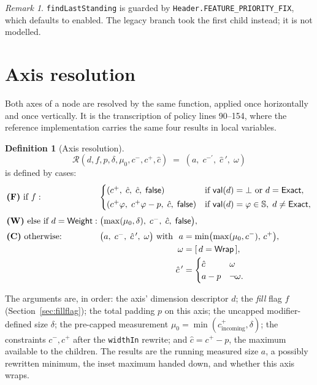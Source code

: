 \documentclass[11pt,a4paper]{article}
\newcommand{\Sc}{\mathbb{S}}
\newcommand{\bo}{\bot}
\newcommand{\Exact}{\mathsf{Exact}}
\newcommand{\Wrap}{\mathsf{Wrap}}
\newcommand{\Weight}{\mathsf{Weight}}
\newcommand{\Rr}{\mathcal{R}}          %
\newcommand{\val}{\mathsf{val}}
\newcommand{\jv}[1]{\texttt{#1}}       %
\theoremstyle{definition}
\newtheorem{definition}{Definition}[section]
\theoremstyle{plain}
\theoremstyle{remark}
\newtheorem*{remark}{Remark}
\begin{document}
\begin{remark}
\jv{findLastStanding} is guarded by \jv{Header.FEATURE\_PRIORITY\_FIX}, which
defaults to enabled. The legacy branch took the first child instead; it is not
modelled.
\end{remark}

\section{Axis resolution}
\label{sec:axis}

Both axes of a node are resolved by the same function, applied once
horizontally and once vertically. It is the transcription of policy lines
90--154, where the reference implementation carries the same four results in
local variables.

\begin{definition}[Axis resolution]
\[
  \Rr(d, f, p, \delta, \mu_0, c^-, c^+, \hat c)
  \;=\; (a,\; c^{-\prime},\; \hat c\,',\; \omega)
\]
is defined by cases:
\[
\begin{array}{@{}l@{\;}l@{}}
\textbf{(F)} \text{ if } f: &
  \begin{cases}
    (c^+,\; \hat c,\; \hat c,\; \textsf{false})
      & \text{if } \val(d) = \bo \text{ or } d = \Exact, \\[2pt]
    (c^+\varphi,\; c^+\varphi - p,\; \hat c,\; \textsf{false})
      & \text{if } \val(d) = \varphi \in \Sc,\; d \neq \Exact,
  \end{cases} \\[16pt]
\textbf{(W)} \text{ else if } d = \Weight: &
  \bigl(\max(\mu_0, \delta),\; c^-,\; \hat c,\; \textsf{false}\bigr), \\[6pt]
\textbf{(C)} \text{ otherwise:} &
  \bigl(a,\; c^-,\; \hat c\,',\; \omega\bigr) \text{ with }
  \begin{aligned}[t]
    a &= \min\bigl(\max(\mu_0, c^-),\, c^+\bigr), \\
    \omega &= [\,d = \Wrap\,], \\
    \hat c\,' &= \begin{cases} \hat c & \omega \\ a - p & \neg\omega. \end{cases}
  \end{aligned}
\end{array}
\]
\end{definition}

The arguments are, in order: the axis' dimension descriptor $d$; the
\emph{fill} flag $f$ (Section~\ref{sec:fillflag}); the total padding $p$ on this
axis; the uncapped modifier-defined size $\delta$; the pre-capped measurement
$\mu_0 = \min(c^+_{\text{incoming}}, \delta)$; the constraints $c^-, c^+$ after
the \jv{widthIn} rewrite; and $\hat c = c^+ - p$, the maximum available to the
children. The results are the running measured size $a$, a possibly rewritten
minimum, the inset maximum handed down, and whether this axis wraps.
\end{document}
